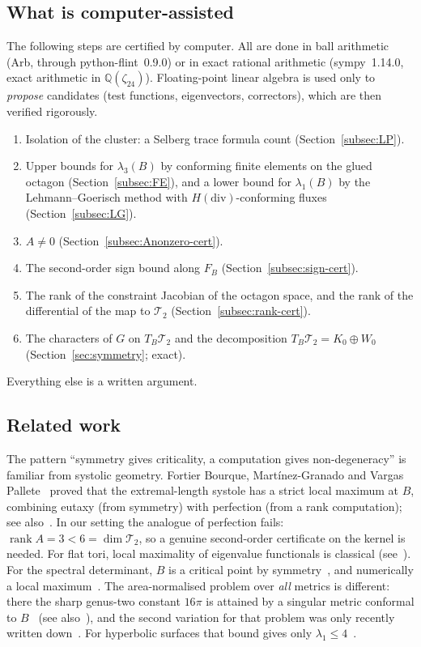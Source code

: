 \documentclass[11pt]{amsart}
\theoremstyle{definition}
\theoremstyle{remark}
\newcommand{\Q}{\mathbb{Q}}
\newcommand{\Teich}{\mathcal{T}_2}
\newcommand{\rank}{\operatorname{rank}}
\newcommand{\FB}{F_B}
\begin{document}
\subsection{What is computer-assisted}
The following steps are certified by computer. All are done in ball arithmetic (Arb, through
python-flint~0.9.0) or in exact rational arithmetic (sympy~1.14.0, exact arithmetic in
$\Q(\zeta_{24})$). Floating-point linear algebra is used only to \emph{propose} candidates
(test functions, eigenvectors, correctors), which are then verified rigorously.
\begin{enumerate}[label=(\alph*)]
\item Isolation of the cluster: a Selberg trace formula count (Section~\ref{subsec:LP}).
\item Upper bounds for $\lambda_3(B)$ by conforming finite elements on the glued octagon
(Section~\ref{subsec:FE}), and a lower bound for $\lambda_1(B)$ by the Lehmann--Goerisch method
with $H(\mathrm{div})$-conforming fluxes (Section~\ref{subsec:LG}).
\item $A\ne0$ (Section~\ref{subsec:Anonzero-cert}).
\item The second-order sign bound along $\FB$ (Section~\ref{subsec:sign-cert}).
\item The rank of the constraint Jacobian of the octagon space, and the rank of the
differential of the map to $\Teich$ (Section~\ref{subsec:rank-cert}).
\item The characters of $G$ on $T_B\Teich$ and the decomposition $T_B\Teich=K_0\oplus W_0$
(Section~\ref{sec:symmetry}; exact).
\end{enumerate}
Everything else is a written argument.

\subsection{Related work}
The pattern ``symmetry gives criticality, a computation gives non-degeneracy'' is familiar
from systolic geometry. Fortier Bourque, Mart\'inez-Granado and Vargas Pallete~\cite{FBMGVP}
proved that the extremal-length systole has a strict local maximum at $B$, combining eutaxy
(from symmetry) with perfection (from a rank computation); see also~\cite{FBR}. In our setting
the analogue of perfection fails: $\rank A=3<6=\dim\Teich$, so a genuine second-order
certificate on the kernel is needed. For flat tori, local maximality of eigenvalue functionals
is classical (see~\cite[\S3.3]{KLO}). For the spectral determinant, $B$ is a critical point by
symmetry~\cite{Kal26}, and numerically a local maximum~\cite[\S7.1]{SU13}. The area-normalised
problem over \emph{all} metrics is different: there the sharp genus-two constant $16\pi$ is
attained by a singular metric conformal to $B$~\cite{NS,JLNNP} (see also~\cite{KPS}), and the
second variation for that problem was only recently written down~\cite{Kar25}. For hyperbolic
surfaces that bound gives only $\lambda_1\le 4$~\cite[\S6]{FBP-K}.
\end{document}
